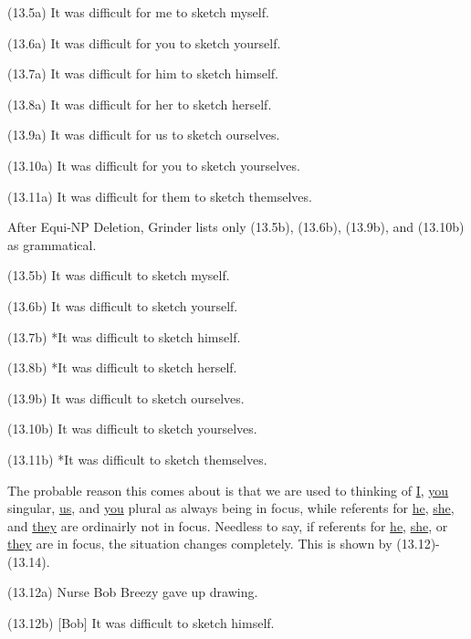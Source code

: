 \documentclass{article}
\begin{document}
\begin{enumerate*}
\item[(13.5a)] It was difficult for me to sketch myself.
\item[(13.6a)] It was difficult for you to sketch yourself.
\item[(13.7a)] It was difficult for him to sketch himself.
\item[(13.8a)] It was difficult for her to sketch herself.
\item[(13.9a)] It was difficult for us to sketch ourselves.
\item[(13.10a)] It was difficult for you to sketch yourselves.
\item[(13.11a)] It was difficult for them to sketch themselves.
\end{enumerate*}

After Equi-NP Deletion, Grinder lists only (13.5b), (13.6b),
(13.9b), and (13.10b) as grammatical.

\begin{enumerate*}
\item[(13.5b)] It was difficult to sketch myself.
\item[(13.6b)] It was difficult to sketch yourself.
\item[(13.7b)] *It was difficult to sketch himself.
\item[(13.8b)] *It was difficult to sketch herself.
\item[(13.9b)] It was difficult to sketch ourselves.
\item[(13.10b)] It was difficult to sketch yourselves.
\item[(13.11b)] *It was difficult to sketch themselves.
\end{enumerate*}

The probable reason this comes about is that we are used to
thinking of \underline{I}, \underline{you} singular,
\underline{us}, and \underline{you} plural as always being in
focus, while referents for \underline{he}, \underline{she}, and
\underline{they} are ordinairly not in focus. Needless to say,
if referents for \underline{he}, \underline{she}, or
\underline{they} are in focus, the situation changes
completely. This is shown by (13.12)-(13.14).

\begin{enumerate*}
\item[(13.12a)] Nurse Bob Breezy gave up drawing.
\item[(13.12b)] [Bob] It was difficult to sketch himself.
\end{enumerate*}
\end{document}

